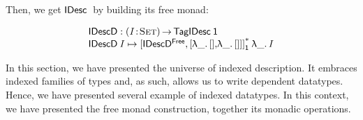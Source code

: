 Then, we get $\IDesc$ by building its free monad:

\[\stk{
\IDescD : \PI{\V{I}}{\Set} \TagIDesc{\Unit} \\
\IDescD\: \V{I} \mapsto \FreeIMonad{\red{[}\IDescFreeD\red{,[}\LAM{\_}[]\red{,}\LAM{\_}\red{[]]]}}{\Unit}\LAM{\_}\V{I}
}\]


In this section, we have presented the universe of indexed
description. It embraces indexed families of types and, as such,
allows us to write dependent datatypes. Hence, we have presented
several example of indexed datatypes. In this context, we have
presented the free monad construction, together its monadic
operations.

